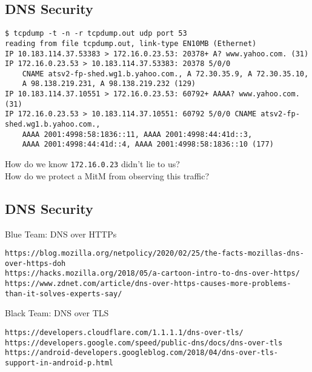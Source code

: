 \documentclass[xga]{xdvislides}
\begin{document}
\subsection{DNS Security}
\begin{verbatim}
$ tcpdump -t -n -r tcpdump.out udp port 53
reading from file tcpdump.out, link-type EN10MB (Ethernet)
IP 10.183.114.37.53383 > 172.16.0.23.53: 20378+ A? www.yahoo.com. (31)
IP 172.16.0.23.53 > 10.183.114.37.53383: 20378 5/0/0
	CNAME atsv2-fp-shed.wg1.b.yahoo.com., A 72.30.35.9, A 72.30.35.10,
	A 98.138.219.231, A 98.138.219.232 (129)
IP 10.183.114.37.10551 > 172.16.0.23.53: 60792+ AAAA? www.yahoo.com. (31)
IP 172.16.0.23.53 > 10.183.114.37.10551: 60792 5/0/0 CNAME atsv2-fp-shed.wg1.b.yahoo.com.,
	AAAA 2001:4998:58:1836::11, AAAA 2001:4998:44:41d::3,
	AAAA 2001:4998:44:41d::4, AAAA 2001:4998:58:1836::10 (177)
\end{verbatim}
\vspace{.25in}
How do we know {\tt 172.16.0.23} didn't lie to us? \\
How do we protect a MitM from observing this traffic?

\subsection{DNS Security}
Blue Team: DNS over HTTPs \\
\begin{verbatim}
https://blog.mozilla.org/netpolicy/2020/02/25/the-facts-mozillas-dns-over-https-doh
https://hacks.mozilla.org/2018/05/a-cartoon-intro-to-dns-over-https/                                
https://www.zdnet.com/article/dns-over-https-causes-more-problems-than-it-solves-experts-say/       
\end{verbatim}

\vspace{.5in}
Black Team: DNS over TLS \\
\begin{verbatim}
https://developers.cloudflare.com/1.1.1.1/dns-over-tls/
https://developers.google.com/speed/public-dns/docs/dns-over-tls                                    
https://android-developers.googleblog.com/2018/04/dns-over-tls-support-in-android-p.html            
\end{verbatim}
 
\end{document}
